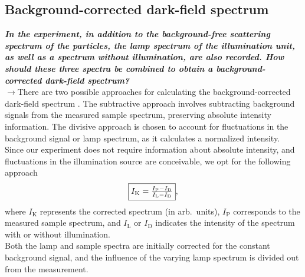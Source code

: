 \subsection{\label{subsec:FZV6}Background-corrected dark-field spectrum}
\textbf{\textit{In the experiment, in addition to the background-free scattering spectrum of the particles, 
the lamp spectrum of the illumination unit, as well as a spectrum without illumination, are also recorded. 
How should these three spectra be combined to obtain a background-corrected dark-field spectrum?}} \\
$\rightarrow$There are two possible approaches for calculating the background-corrected dark-field 
spectrum \cite{FZV5}. The subtractive approach involves subtracting background signals from the measured 
sample spectrum, preserving absolute intensity information. The divisive approach is chosen to account for 
fluctuations in the background signal or lamp spectrum, as it calculates a normalized intensity. \\
Since our experiment does not require information about absolute intensity, and fluctuations in the 
illumination source are conceivable, we opt for the following approach
\begin{equation}
    \fbox{$I_{\text{K}} = \frac{I_{\text{P}}-I_{\text{D}}}{I_{\text{L}}-I_{\text{D}}}$},
\end{equation}
where $I_{\text{K}}$ represents the corrected spectrum (in arb.~units), 
$I_{\text{P}}$ corresponds to the measured sample spectrum, and $I_{\text{L}}$ or $I_{\text{D}}$ 
indicates the intensity of the spectrum with or without illumination. \\
Both the lamp and sample spectra are initially corrected for the constant background signal, and 
the influence of the varying lamp spectrum is divided out from the measurement. \\